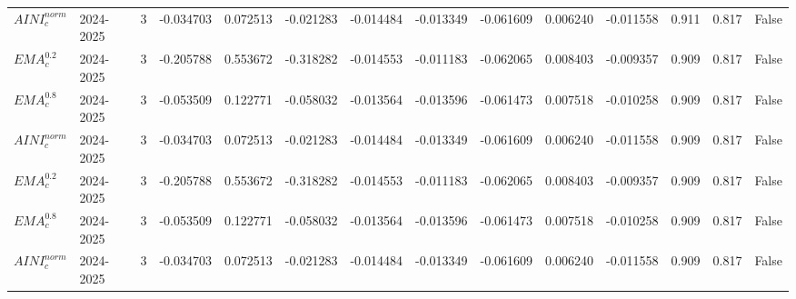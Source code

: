 \begin{tabular}{@{}llrrrrrrrrrlll@{}}
$AINI^{norm}_{c}$ & 2024-2025 & 3 & -0.034703 & 0.072513 & -0.021283 & -0.014484 & -0.013349 & -0.061609 & 0.006240 & -0.011558 & 0.911 & 0.817 & False \\
$EMA^{0.2}_{c}$ & 2024-2025 & 3 & -0.205788 & 0.553672 & -0.318282 & -0.014553 & -0.011183 & -0.062065 & 0.008403 & -0.009357 & 0.909 & 0.817 & False \\
$EMA^{0.8}_{c}$ & 2024-2025 & 3 & -0.053509 & 0.122771 & -0.058032 & -0.013564 & -0.013596 & -0.061473 & 0.007518 & -0.010258 & 0.909 & 0.817 & False \\
$AINI^{norm}_{c}$ & 2024-2025 & 3 & -0.034703 & 0.072513 & -0.021283 & -0.014484 & -0.013349 & -0.061609 & 0.006240 & -0.011558 & 0.909 & 0.817 & False \\
$EMA^{0.2}_{c}$ & 2024-2025 & 3 & -0.205788 & 0.553672 & -0.318282 & -0.014553 & -0.011183 & -0.062065 & 0.008403 & -0.009357 & 0.909 & 0.817 & False \\
$EMA^{0.8}_{c}$ & 2024-2025 & 3 & -0.053509 & 0.122771 & -0.058032 & -0.013564 & -0.013596 & -0.061473 & 0.007518 & -0.010258 & 0.909 & 0.817 & False \\
$AINI^{norm}_{c}$ & 2024-2025 & 3 & -0.034703 & 0.072513 & -0.021283 & -0.014484 & -0.013349 & -0.061609 & 0.006240 & -0.011558 & 0.909 & 0.817 & False \\
\bottomrule
\end{tabular}
